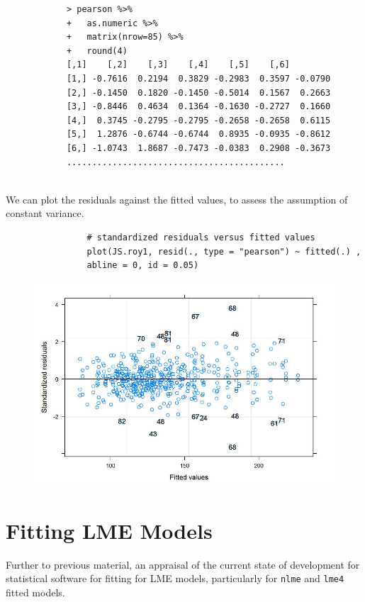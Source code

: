 \documentclass[12pt, a4paper]{report}
\theoremstyle{plain}
\theoremstyle{definition}
\theoremstyle{remark}
\begin{document}
		
		\begin{framed}
			\begin{verbatim}
			> pearson %>%
			+   as.numeric %>% 
			+   matrix(nrow=85) %>%
			+   round(4) 
			[,1]    [,2]    [,3]    [,4]    [,5]    [,6]
			[1,] -0.7616  0.2194  0.3829 -0.2983  0.3597 -0.0790
			[2,] -0.1450  0.1820 -0.1450 -0.5014  0.1567  0.2663
			[3,] -0.8446  0.4634  0.1364 -0.1630 -0.2727  0.1660
			[4,]  0.3745 -0.2795 -0.2795 -0.2658 -0.2658  0.6115
			[5,]  1.2876 -0.6744 -0.6744  0.8935 -0.0935 -0.8612
			[6,] -1.0743  1.8687 -0.7473 -0.0383  0.2908 -0.3673
			...........................................
			
			\end{verbatim}
		\end{framed}
		
			We can plot the residuals against the fitted values, to assess the assumption of constant variance. 
			\begin{framed}
				\begin{verbatim}
				# standardized residuals versus fitted values 
				plot(JS.roy1, resid(., type = "pearson") ~ fitted(.) , 
				abline = 0, id = 0.05)
				\end{verbatim}
			\end{framed}
			\begin{figure}[h!]
				\centering
				\includegraphics[width=0.9\linewidth]{images/Residuals-JS-Roy}
				\caption{}
				\label{fig:Residuals-JS-Roy}
			\end{figure}
			
					
	
	\chapter{Fitting LME Models}
	Further to previous material, an appraisal of the current state of development for statistical software for fitting for LME models, particularly for \texttt{nlme} and \texttt{lme4} fitted models.
	
\end{document}
